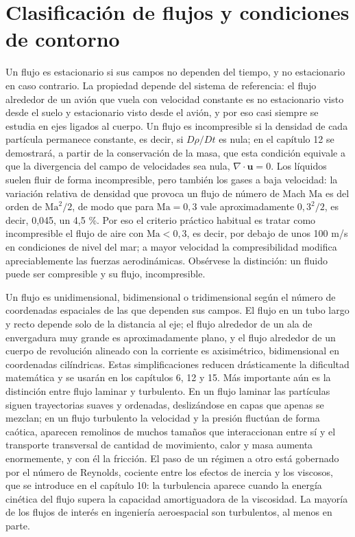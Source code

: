 \documentclass[10pt,openany]{book}
\begin{document}
\section{Clasificación de flujos y condiciones de contorno}

Un flujo es estacionario si sus campos no dependen del tiempo, y no estacionario en caso contrario. La propiedad depende del sistema de referencia: el flujo alrededor de un avión que vuela con velocidad constante es no estacionario visto desde el suelo y estacionario visto desde el avión, y por eso casi siempre se estudia en ejes ligados al cuerpo. Un flujo es incompresible si la densidad de cada partícula permanece constante, es decir, si \(D\rho/Dt\) es nula; en el capítulo 12 se demostrará, a partir de la conservación de la masa, que esta condición equivale a que la divergencia del campo de velocidades sea nula, \(\nabla\cdot\mathbf{u} = 0\). Los líquidos suelen fluir de forma incompresible, pero también los gases a baja velocidad: la variación relativa de densidad que provoca un flujo de número de Mach \(\mathrm{Ma}\) es del orden de \(\mathrm{Ma}^{2}/2\), de modo que para \(\mathrm{Ma} = 0{,}3\) vale aproximadamente \(0{,}3^{2}/2\), es decir, 0,045, un 4,5 \%. Por eso el criterio práctico habitual es tratar como incompresible el flujo de aire con \(\mathrm{Ma} < 0{,}3\), es decir, por debajo de unos 100 m/s en condiciones de nivel del mar; a mayor velocidad la compresibilidad modifica apreciablemente las fuerzas aerodinámicas. Obsérvese la distinción: un fluido puede ser compresible y su flujo, incompresible.

Un flujo es unidimensional, bidimensional o tridimensional según el número de coordenadas espaciales de las que dependen sus campos. El flujo en un tubo largo y recto depende solo de la distancia al eje; el flujo alrededor de un ala de envergadura muy grande es aproximadamente plano, y el flujo alrededor de un cuerpo de revolución alineado con la corriente es axisimétrico, bidimensional en coordenadas cilíndricas. Estas simplificaciones reducen drásticamente la dificultad matemática y se usarán en los capítulos 6, 12 y 15. Más importante aún es la distinción entre flujo laminar y turbulento. En un flujo laminar las partículas siguen trayectorias suaves y ordenadas, deslizándose en capas que apenas se mezclan; en un flujo turbulento la velocidad y la presión fluctúan de forma caótica, aparecen remolinos de muchos tamaños que interaccionan entre sí y el transporte transversal de cantidad de movimiento, calor y masa aumenta enormemente, y con él la fricción. El paso de un régimen a otro está gobernado por el número de Reynolds, cociente entre los efectos de inercia y los viscosos, que se introduce en el capítulo 10: la turbulencia aparece cuando la energía cinética del flujo supera la capacidad amortiguadora de la viscosidad. La mayoría de los flujos de interés en ingeniería aeroespacial son turbulentos, al menos en parte.
\end{document}
